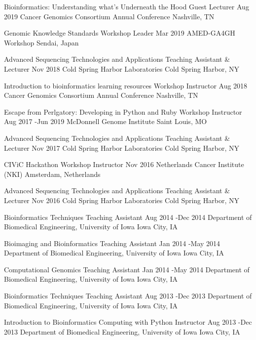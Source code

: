 \documentclass[10pt]{article} %
\begin{document}
\instruction
{Bioinformatics: Understanding what's Underneath the Hood}
{Guest Lecturer}
{Aug 2019}{}
{Cancer Genomics Consortium Annual Conference}
{Nashville, TN}

\instruction
{Genomic Knowledge Standards}
{Workshop Leader}
{Mar 2019}{}
{AMED-GA4GH Workshop}
{Sendai, Japan}

\instruction
{Advanced Sequencing Technologies and Applications}
{Teaching Assistant \& Lecturer}
{Nov 2018}{}
{Cold Spring Harbor Laboratories}
{Cold Spring Harbor, NY}

\instruction
{Introduction to bioinformatics learning resources}
{Workshop Instructor}
{Aug 2018}{}
{Cancer Genomics Consortium Annual Conference}
{Nashville, TN}

\instruction
{Escape from Perlgatory: Developing in Python and Ruby}
{Workshop Instructor}
{Aug 2017 -}{Jun 2019}
{McDonnell Genome Institute}
{Saint Louis, MO}

\instruction
{Advanced Sequencing Technologies and Applications}
{Teaching Assistant \& Lecturer}
{Nov 2017}{}
{Cold Spring Harbor Laboratories}
{Cold Spring Harbor, NY}

\instruction
{CIViC Hackathon}
{Workshop Instructor}
{Nov 2016}{}
{Netherlands Cancer Institute (NKI)}
{Amsterdam, Netherlands}

\instruction
{Advanced Sequencing Technologies and Applications}
{Teaching Assistant \& Lecturer}
{Nov 2016}{}
{Cold Spring Harbor Laboratories}
{Cold Spring Harbor, NY}

\instruction
{Bioinformatics Techniques}
{Teaching Assistant}
{Aug 2014 -}{Dec 2014}
{Department of Biomedical Engineering, University of Iowa}
{Iowa City, IA}

\instruction
{Bioimaging and Bioinformatics}
{Teaching Assistant}
{Jan 2014 -}{May 2014}
{Department of Biomedical Engineering, University of Iowa}
{Iowa City, IA}

\instruction
{Computational Genomics}
{Teaching Assistant}
{Jan 2014 -}{May 2014}
{Department of Biomedical Engineering, University of Iowa}
{Iowa City, IA}

\instruction
{Bioinformatics Techniques}
{Teaching Assistant}
{Aug 2013 -}{Dec 2013}
{Department of Biomedical Engineering, University of Iowa}
{Iowa City, IA}

\instruction
{Introduction to Bioinformatics Computing with Python}
{Instructor}
{Aug 2013 -}{Dec 2013}
{Department of Biomedical Engineering, University of Iowa}
{Iowa City, IA}

\end{document}
